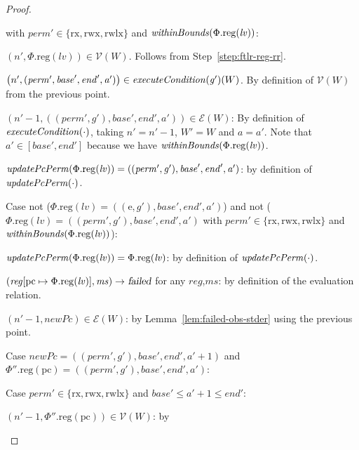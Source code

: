 \documentclass[a4paper]{article}
\newcommand{\update}[2]{[#1 \mapsto #2]}
\newcommand{\var}[1]{\mathit{#1}}
\newcommand{\hs}{\var{ms}}
\newcommand{\ms}{\hs}
\newcommand{\lv}{\var{lv}}
\newcommand{\gl}{\var{g}}
\newcommand{\pcreg}{\mathrm{pc}}
\newcommand{\addr}{\var{a}}
\newcommand{\start}{\var{base}}
\newcommand{\addrend}{\var{end}}
\newcommand{\reg}{\var{reg}}
\newcommand{\perm}{\var{perm}}
\newcommand{\plainproj}[1]{\mathrm{#1}}
\newcommand{\memreg}[1][\Phi]{#1.\plainproj{reg}}
\newcommand{\failed}{\textsl{failed}}
\newcommand{\plainfun}[2]{
  \ifthenelse{\equal{#2}{}}
  {\mathit{#1}}
  {\mathit{#1}(#2)}
}
\newcommand{\updatePcPerm}[1]{\plainfun{updatePcPerm}{#1}}
\newcommand{\withinBounds}[1]{\plainfun{withinBounds}{#1}}
\newcommand{\execCond}[1]{\plainfun{executeCondition}{#1}}
\newcommand{\asmType}{\plaindom{AsmType}}
\newcommand{\plaindom}[1]{\mathrm{#1}}
\newcommand{\intr}[2]{\mathcal{#1}}
\newcommand{\valueintr}[1]{\intr{V}{#1}}
\newcommand{\exprintr}[1]{\intr{E}{#1}}
\newcommand{\stdvr}{\valueintr{\asmType}}
\newcommand{\stder}{\exprintr{\asmType}}
\newcommand{\npair}[2][n]{\left(#1,#2 \right)}
\newcommand{\plainperm}[1]{\mathrm{#1}}
\newcommand{\exec}{\plainperm{rx}}
\newcommand{\entry}{\plainperm{e}}
\newcommand{\rwx}{\plainperm{rwx}}
\newcommand{\rwlx}{\plainperm{rwlx}}
\newcommand{\step}[1][]{\rightarrow_{#1}}
\begin{document}
\begin{proof}
\begin{enumproof}
\begin{enumproof}
\begin{enumproof}
\begin{enumproof}
          with $\perm' \in \{\exec,\rwx,\rwlx\}$ and $\withinBounds{\memreg(\lv)}$:
          \begin{enumproof}
          \item $\npair[n']{\memreg(\lv)} \in \stdvr(W)$.  Follows from
            Step~\ref{step:ftlr-reg-rr}.
          \item $\npair[n']{(\perm',\start',\addrend',\addr')} \in \execCond{\gl'}(W)$.
            By definition of $\stdvr(W)$ from the previous point.
          \item $\npair[n'-1]{((\perm',\gl'),\start',\addrend',\addr')} \in
            \stder(W)$: By definition of $\execCond{\cdot}$, taking $n' = n'-1$,
            $W' = W$ and $\addr = \addr'$. Note that $\addr' \in
            [\start',\addrend']$ because we have $\withinBounds{\memreg(\lv)}$.
          \item $\updatePcPerm{\memreg(\lv)} =
            ((\perm',\gl'),\start',\addrend',\addr')$: by definition of
            $\updatePcPerm{\cdot}$.
          \end{enumproof}
        \item Case not ($\memreg(\lv) =
          ((\entry,\gl'),\start',\addrend',\addr')$) and not ($\memreg(\lv) =
          ((\perm',\gl'),\start',\addrend',\addr')$ with $\perm' \in
          \{\exec,\rwx,\rwlx\}$ and $\withinBounds{\memreg(\lv)}$):
          \begin{enumproof}
          \item $\updatePcPerm{\memreg(\lv)} = \memreg(\lv)$: by definition of 
            $\updatePcPerm{\cdot}$.
          \item $(\reg\update{\pcreg}{\memreg(\lv)},\ms)\step\failed$ for any
            $\reg$,$\ms$: by definition of the evaluation relation.
          \item $\npair[n'-1]{\var{newPc}} \in \stder(W)$: by
            Lemma~\ref{lem:failed-obs-stder} using the previous point.
          \end{enumproof}
        \end{enumproof}
      \item Case $\var{newPc} = ((\perm',\gl'),\start',\addrend',\addr' + 1)$ and
        $\memreg[\Phi''](\pcreg) = ((\perm',\gl'),\start',\addrend',\addr')$:
        \begin{enumproof}
        \item Case $\perm' \in \{\exec,\rwx,\rwlx\}$ and $\start'\leq
          \addr'+1\leq \addrend'$:
          \begin{enumproof}
          \item $\npair[n'-1]{\memreg[\Phi''](\pcreg)} \in \stdvr(W)$: by

\end{enumproof}
\end{enumproof}
\end{enumproof}
\end{enumproof}
\end{enumproof}
\end{proof}
\end{document}
